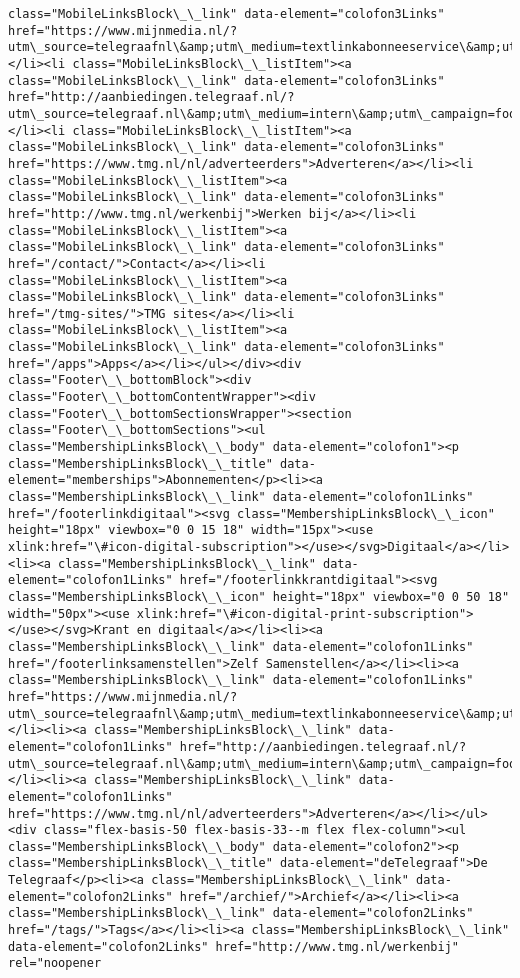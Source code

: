 \documentclass[11pt]{article}
\begin{document}
\begin{Verbatim}[commandchars=\\\{\}]
class="MobileLinksBlock\_\_link" data-element="colofon3Links" href="https://www.mijnmedia.nl/?utm\_source=telegraafnl\&amp;utm\_medium=textlinkabonneeservice\&amp;utm\_campaign=service">Service</a></li><li class="MobileLinksBlock\_\_listItem"><a class="MobileLinksBlock\_\_link" data-element="colofon3Links" href="http://aanbiedingen.telegraaf.nl/?utm\_source=telegraaf.nl\&amp;utm\_medium=intern\&amp;utm\_campaign=footertelegraaf">Deals</a></li><li class="MobileLinksBlock\_\_listItem"><a class="MobileLinksBlock\_\_link" data-element="colofon3Links" href="https://www.tmg.nl/nl/adverteerders">Adverteren</a></li><li class="MobileLinksBlock\_\_listItem"><a class="MobileLinksBlock\_\_link" data-element="colofon3Links" href="http://www.tmg.nl/werkenbij">Werken bij</a></li><li class="MobileLinksBlock\_\_listItem"><a class="MobileLinksBlock\_\_link" data-element="colofon3Links" href="/contact/">Contact</a></li><li class="MobileLinksBlock\_\_listItem"><a class="MobileLinksBlock\_\_link" data-element="colofon3Links" href="/tmg-sites/">TMG sites</a></li><li class="MobileLinksBlock\_\_listItem"><a class="MobileLinksBlock\_\_link" data-element="colofon3Links" href="/apps">Apps</a></li></ul></div><div class="Footer\_\_bottomBlock"><div class="Footer\_\_bottomContentWrapper"><div class="Footer\_\_bottomSectionsWrapper"><section class="Footer\_\_bottomSections"><ul class="MembershipLinksBlock\_\_body" data-element="colofon1"><p class="MembershipLinksBlock\_\_title" data-element="memberships">Abonnementen</p><li><a class="MembershipLinksBlock\_\_link" data-element="colofon1Links" href="/footerlinkdigitaal"><svg class="MembershipLinksBlock\_\_icon" height="18px" viewbox="0 0 15 18" width="15px"><use xlink:href="\#icon-digital-subscription"></use></svg>Digitaal</a></li><li><a class="MembershipLinksBlock\_\_link" data-element="colofon1Links" href="/footerlinkkrantdigitaal"><svg class="MembershipLinksBlock\_\_icon" height="18px" viewbox="0 0 50 18" width="50px"><use xlink:href="\#icon-digital-print-subscription"></use></svg>Krant en digitaal</a></li><li><a class="MembershipLinksBlock\_\_link" data-element="colofon1Links" href="/footerlinksamenstellen">Zelf Samenstellen</a></li><li><a class="MembershipLinksBlock\_\_link" data-element="colofon1Links" href="https://www.mijnmedia.nl/?utm\_source=telegraafnl\&amp;utm\_medium=textlinkabonneeservice\&amp;utm\_campaign=service">Service</a></li><li><a class="MembershipLinksBlock\_\_link" data-element="colofon1Links" href="http://aanbiedingen.telegraaf.nl/?utm\_source=telegraaf.nl\&amp;utm\_medium=intern\&amp;utm\_campaign=footertelegraaf">Deals</a></li><li><a class="MembershipLinksBlock\_\_link" data-element="colofon1Links" href="https://www.tmg.nl/nl/adverteerders">Adverteren</a></li></ul><div class="flex-basis-50 flex-basis-33--m flex flex-column"><ul class="MembershipLinksBlock\_\_body" data-element="colofon2"><p class="MembershipLinksBlock\_\_title" data-element="deTelegraaf">De Telegraaf</p><li><a class="MembershipLinksBlock\_\_link" data-element="colofon2Links" href="/archief/">Archief</a></li><li><a class="MembershipLinksBlock\_\_link" data-element="colofon2Links" href="/tags/">Tags</a></li><li><a class="MembershipLinksBlock\_\_link" data-element="colofon2Links" href="http://www.tmg.nl/werkenbij" rel="noopener 
\end{Verbatim}
\end{document}
